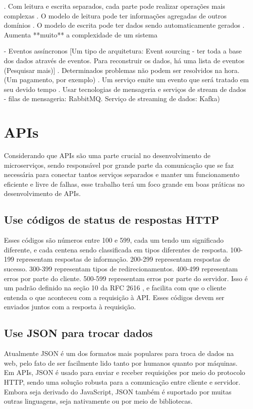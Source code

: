            . Com leitura e escrita separados, cada parte pode realizar operações mais complexas
           . O modelo de leitura pode ter informações agregadas de outros domínios
           . O modelo de escrita pode ter dados sendo automaticamente gerados
           . Aumenta **muito** a complexidade de um sistema

        - Eventos assíncronos
            [Um tipo de arquitetura: Event sourcing - ter toda a base dos dados através de eventos. Para reconstruir os dados, há uma lista de eventos (Pesquisar mais)]
            . Determinados problemas não podem ser resolvidos na hora. (Um pagamento, por exemplo)
            . Um serviço emite um evento que será tratado em seu devido tempo
            . Usar tecnologias de mensageria e serviços de stream de dados - filas de mensageria: RabbitMQ. Serviço de streaming de dados: Kafka)

\section{APIs}

Considerando que APIs são uma parte crucial no desenvolvimento de microserviços, sendo responsável por grande parte da comunicação que se faz necessária para conectar tantos serviços separados e manter um funcionamento eficiente e livre de falhas, esse trabalho terá um foco grande em boas práticas no desenvolvimento de APIs.

\subsection{Use códigos de status de respostas HTTP}
Esses códigos são números entre 100 e 599, cada um tendo um significado diferente, e cada centena sendo classificada em tipos diferentes de resposta. 100-199 representam respostas de informação. 200-299 representam respostas de sucesso. 300-399 representam tipos de redirecionamentos. 400-499 representam erros por parte do cliente. 500-599 representam erros por parte do servidor. Isso é um padrão definido na seção 10 da RFC 2616 \cite{rfc_http_nielsen_1999}, e facilita com que o cliente entenda o que aconteceu com a requisição à API. Esses códigos devem ser enviados juntos com a resposta à requisição.

\subsection{Use JSON para trocar dados}
Atualmente JSON é um dos formatos mais populares para troca de dados na web, pelo fato de ser facilmente lido tanto por humanos quanto por máquinas. Em APIs, JSON é usado para enviar e receber requisições por meio do protocolo HTTP, sendo uma solução robusta para a comunicação entre cliente e servidor. Embora seja derivado do JavaScript, JSON também é suportado por muitas outras linguagens, seja nativamente ou por meio de bibliotecas.  \cite{json_bourhis_2020}

